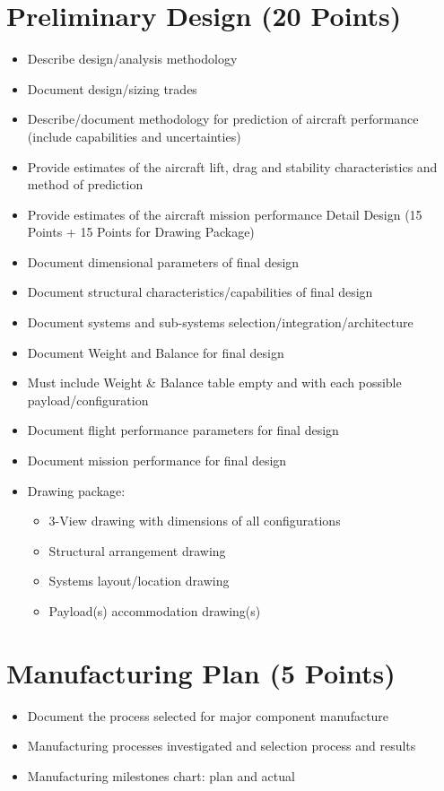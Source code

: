 \documentclass[journal]{byu-aero}
\begin{document}
\section{Preliminary Design (20 Points)}
\label{sec:PreliminaryDesign}
\begin{itemize}
\item Describe design/analysis methodology
\item Document design/sizing trades
\item Describe/document methodology for prediction of aircraft performance (include capabilities and uncertainties)
\item Provide estimates of the aircraft lift, drag and stability characteristics and method of prediction
\item Provide estimates of the aircraft mission performance Detail Design (15 Points + 15 Points for Drawing Package)
\item Document dimensional parameters of final design
\item Document structural characteristics/capabilities of final design
\item Document systems and sub-systems selection/integration/architecture
\item Document Weight and Balance for final design
\item Must include Weight \& Balance table empty and with each possible payload/configuration
\item Document flight performance parameters for final design
\item Document mission performance for final design
\item Drawing package:
	\begin{itemize}
	\item 3-View drawing with dimensions of all configurations
	\item Structural arrangement drawing
	\item Systems layout/location drawing
	\item Payload(s) accommodation drawing(s)
	\end{itemize}
\end{itemize}

\section{Manufacturing Plan (5 Points)}
\label{sec:ManufacturingPlan}
\begin{itemize}
\item Document the process selected for major component manufacture
\item Manufacturing processes investigated and selection process and results
\item Manufacturing milestones chart: plan and actual
\end{itemize}
\end{document}
